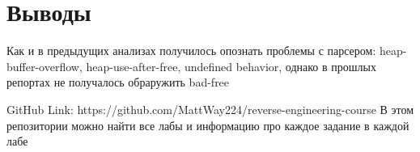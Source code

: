    \section{Выводы}
    Как и в предыдущих анализах получилось опознать проблемы с парсером: heap-buffer-overflow, heap-use-after-free, undefined behavior, однако в прошлых репортах не получалось обраружить bad-free


    \begin{thebibliography}{1}
        GitHub Link: https://github.com/MattWay224/reverse-engineering-course
        В этом репозитории можно найти все лабы и информацию про каждое задание в каждой лабе
    \end{thebibliography}

